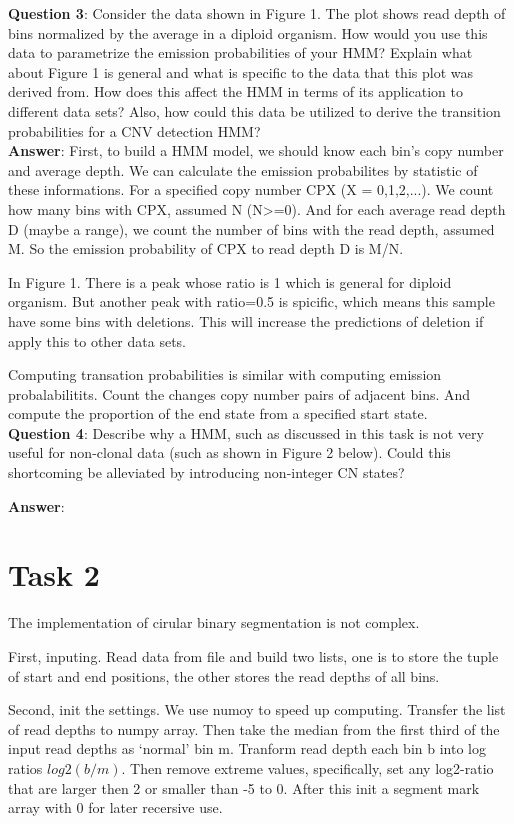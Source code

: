 \documentclass[a4paper]{article}
\begin{document}
\noindent\textbf{Question 3}: Consider the data shown in Figure 1. The plot shows read depth of bins normalized by the average in a diploid organism. How would you use this data to parametrize the emission probabilities of your HMM? Explain what about Figure 1 is general and what is specific to the data that this plot was derived from. How does this affect the HMM in terms of its application to different data sets? Also, how could this data be utilized to derive the transition probabilities for a CNV detection HMM?\\

\noindent\textbf{Answer}: First, to build a HMM model, we should know each bin's copy number and average depth. We can calculate the emission probabilites by statistic of these informations. For a specified copy number CPX (X = 0,1,2,...). We count how many bins with CPX, assumed N (N>=0). And for each average read depth D (maybe a range), we count the number of bins with the read depth, assumed M. So the emission probability of CPX to read depth D is M/N. 

In Figure 1. There is a peak whose ratio is 1 which is general for diploid organism. But another peak with ratio=0.5 is spicific, which means this sample have some bins with deletions. This will increase the predictions of deletion if apply this to other data sets. 

Computing transation probabilities is similar with computing emission probalabilitits. Count the changes copy number pairs of adjacent bins. And compute the proportion of the end state from a specified start state.\\

\noindent\textbf{Question 4}: Describe why a HMM, such as discussed in this task is not very useful for non-clonal data (such as shown in Figure 2 below). Could this shortcoming be alleviated by introducing non-integer CN states?

\noindent\textbf{Answer}:  

\section{Task 2}

The implementation of cirular binary segmentation is not complex. 

First, inputing. Read data from file and build two lists, one is to store the tuple of start and end positions, the other stores the read depths of all bins. 

Second, init the settings. We use numoy to speed up computing. Transfer the list of read depths to numpy array. Then take the median from the first third of the input read depths as `normal' bin m. Tranform read depth each bin b into log ratios $log2(b/m)$. Then remove extreme values, specifically, set any log2-ratio that are larger then 2 or smaller than -5 to 0. After this init a segment mark array with 0 for later recersive use. 
\end{document}
